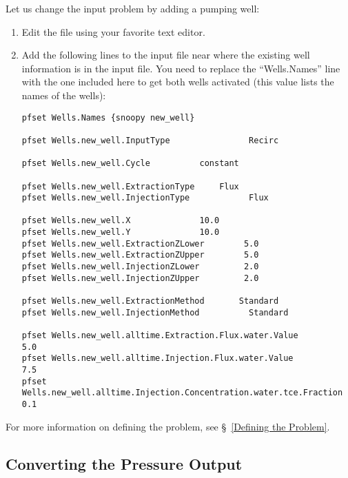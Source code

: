 Let us change the input problem by adding a pumping well:
\begin{enumerate}

\item
Edit the file  using your favorite text editor.

\item 
Add the following lines to the input file near where the existing
well information is in the input file.  You need to replace
the ``Wells.Names'' line with the one included here to get both
wells activated (this value lists the names of the wells):

\begin{display}\begin{verbatim}
pfset Wells.Names {snoopy new_well}

pfset Wells.new_well.InputType                Recirc

pfset Wells.new_well.Cycle		    constant

pfset Wells.new_well.ExtractionType	    Flux
pfset Wells.new_well.InjectionType            Flux

pfset Wells.new_well.X			    10.0 
pfset Wells.new_well.Y			    10.0
pfset Wells.new_well.ExtractionZLower	     5.0
pfset Wells.new_well.ExtractionZUpper	     5.0
pfset Wells.new_well.InjectionZLower	     2.0
pfset Wells.new_well.InjectionZUpper	     2.0

pfset Wells.new_well.ExtractionMethod	    Standard
pfset Wells.new_well.InjectionMethod          Standard

pfset Wells.new_well.alltime.Extraction.Flux.water.Value        	     5.0
pfset Wells.new_well.alltime.Injection.Flux.water.Value		     7.5
pfset Wells.new_well.alltime.Injection.Concentration.water.tce.Fraction 0.1

\end{verbatim}\end{display}

\end{enumerate}
For more information on defining the problem,
see \S~\ref{Defining the Problem}.

\subsection*{Converting the Pressure Output}

